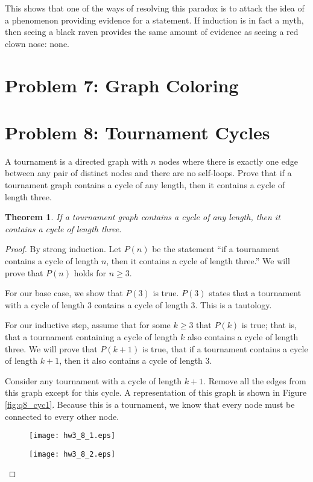 \documentclass[10pt,letter]{article}
\newtheorem*{thm}{Theorem}
\begin{document}
This shows that one of the ways of resolving this paradox is to attack the idea of a phenomenon providing evidence for a statement. If induction is in fact a myth, then seeing a black raven provides the same amount of evidence as seeing a red clown nose: none. 

\section*{Problem 7: Graph Coloring}


\section*{Problem 8: Tournament Cycles}
A tournament is a directed graph with $n$ nodes where there is exactly one edge between any pair of distinct nodes and there are no self-loops. Prove that if a tournament graph contains a cycle of any length, then it contains a cycle of length three.

\begin{thm} If a tournament graph contains a cycle of any length, then it contains a cycle of length three.
\end{thm}

\begin{proof} By strong induction. Let $P(n)$ be the statement ``if a tournament contains a cycle of length $n$, then it contains a cycle of length three.'' We will prove that $P(n)$ holds for $n \ge 3$. 

For our base case, we show that $P(3)$ is true. $P(3)$ states that a tournament with a cycle of length 3 contains a cycle of length 3. This is a tautology.

For our inductive step, assume that for some $k \ge 3$ that $P(k)$ is true; that is, that a tournament containing a cycle of length $k$ also contains a cycle of length three. We will prove that $P(k+1)$ is true, that if a tournament contains a cycle of length $k+1$, then it also contains a cycle of length 3.

Consider any tournament with a cycle of length $k+1$. Remove all the edges from this graph except for this cycle. A representation of this graph is shown in Figure \ref{fig:q8_cyc1}. Because this is a tournament, we know that every node must be connected to every other node. 

\begin{figure}
\centering
\begin{minipage}{.5\textwidth}
  \centering
  \texttt{[image: hw3\_8\_1.eps]}
  \label{fig:q8_cyc1}
\end{minipage}%
\begin{minipage}{.5\textwidth}
  \centering
  \texttt{[image: hw3\_8\_2.eps]}
  \label{fig:q8_test2}
\end{minipage}
\end{figure}

\end{proof}
\end{document}

